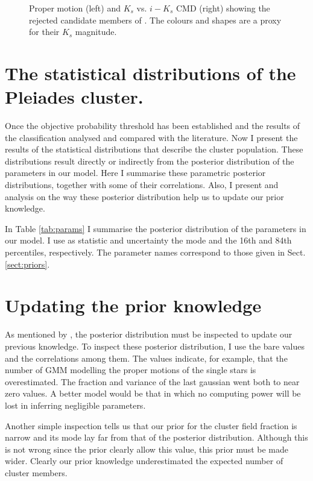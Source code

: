 \begin{figure}[htbp]
\begin{center}
\caption{Proper motion (left) and $K_s$ vs. $i-K_s$ CMD (right) showing the rejected candidate members of \citet{Bouy2015}. The colours and shapes are a proxy for their $K_s$ magnitude.}
\label{figure:rejectedsCOLORS}
\end{center}
\end{figure}

 
\section{The statistical distributions of the Pleiades cluster.}
Once the objective probability threshold has been established and the results of the classification analysed and compared with the literature. Now I present the results of the statistical distributions that describe the cluster population. These distributions result directly or indirectly from the posterior distribution of the parameters in our model. Here I summarise these parametric posterior distributions, together with some of their correlations. Also, I present and analysis on the way these posterior distribution help us to update our prior knowledge.

In Table \ref{tab:params} I summarise the posterior distribution of the parameters in our model. I use as statistic and uncertainty the mode and the 16th and 84th percentiles, respectively. The parameter names correspond to those given in Sect. \ref{sect:priors}. 


%

\section{Updating the prior knowledge}
As mentioned by \citet{Gelman2006}, the posterior distribution must be inspected to update our previous knowledge. To inspect these posterior distribution, I use the bare values and the correlations among them. The values indicate, for example, that the number of  GMM modelling the proper motions of the single stars is overestimated. The fraction and variance of the last gaussian went both to near zero values. A better model would be that in which no computing power will be lost in inferring negligible parameters.

Another simple inspection tells us that our prior for the cluster field fraction is narrow and its mode lay far from that of the posterior distribution. Although this is not wrong since the prior clearly allow this value, this prior must be made wider.  Clearly our prior knowledge underestimated the expected number of cluster members.   

